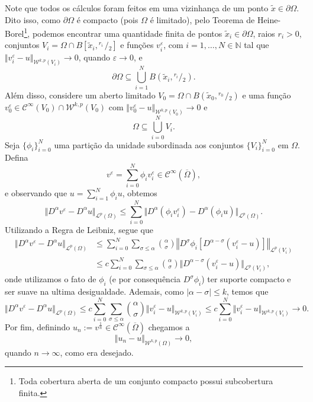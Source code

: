 \documentclass[a4paper, 11pt]{book}
\theoremstyle{definition}
\newcommand{\bN}{\mathbb{N}}
\newcommand{\cC}{\mathcal{C}}
\newcommand{\cL}{\mathcal{L}}
\newcommand{\cW}{\mathcal{W}}
\newcommand{\sfrac}[2]{{}^{#1}\!\!/\!_{#2}}
\begin{document}
\begin{prf}
    Note que todos os cálculos foram feitos em uma vizinhança de um ponto $\tilde x \in \partial\Omega$. Dito isso, como $\partial \Omega$ é compacto (pois $\Omega$ é limitado), pelo Teorema de Heine-Borel\footnote{Toda cobertura aberta de um conjunto compacto possui subcobertura finita.}, podemos encontrar uma quantidade finita de pontos $\tilde x_i \in \partial \Omega$, raios $r_i > 0$, conjuntos $V_i = \Omega \cap B[\tilde x_i,\sfrac{r_i\,}{2}]$ e funções $v_i^\varepsilon$, com $i = 1,\dots,N \in \bN$ tal que $\Vert v_i^\varepsilon - u \Vert_{\cW^{k,p}(V_i)} \to 0$, quando $\varepsilon \to 0$, e 
    \[
        \partial\Omega \subseteq \bigcup_{i=1}^N B(\tilde x_i, \sfrac{r_i}{2}).
    \]
    Além disso, considere um aberto limitado $V_0 = \Omega \cap B(\tilde x_0, \sfrac{r_0\,}{2})$ e uma função $v^\varepsilon_0 \in \cC^{\infty}(V_0) \cap \cW^{k,p}(V_0)$ com $\Vert v^\varepsilon_0 - u \Vert_{\cW^{k,p}(V_0)} \to 0$ e
    \[
        \Omega \subseteq \bigcup_{i=0}^N V_i.
    \]
    Seja $\{\phi_i\}_{i=0}^N$ uma partição da unidade subordinada aos conjuntos $\{V_i\}_{i=0}^N$ em $\Omega$.
    Defina
    \[
        v^\varepsilon = \sum_{i=0}^N \phi_i v_i^\varepsilon \in \cC^{\infty}(\overline\Omega),
    \]
    e observando que $u = \sum_{i=1}^N \phi_i u$, obtemos
    \[
        \Vert D^\alpha v^\varepsilon - D^\alpha u \Vert_{\cL^p(\Omega)} \leqslant \sum_{i=0}^N \Vert D^\alpha (\phi_i v_i^\varepsilon) - D^\alpha(\phi_i u) \Vert_{\cL^p(\Omega)}.
    \]
    Utilizando a Regra de Leibniz, segue que
    \[
        \begin{aligned}
            \Vert D^\alpha v^\varepsilon - D^\alpha u \Vert_{\cL^p(\Omega)} &\leqslant \sum_{i=0}^N\sum_{\sigma \leqslant \alpha} \binom{\alpha}{\sigma} \left\Vert  D^{\sigma} \phi_i \left[ D^{\alpha - \sigma} \left( v_i^\varepsilon - u \right) \right] \right\Vert _{\cL^p(V_i)}\\ 
            &\leqslant c\sum_{i=0}^N\sum_{\sigma \leqslant \alpha} \binom{\alpha}{\sigma} \Vert D^{\alpha-\sigma}(v^\varepsilon_i - u) \Vert_{\cL^p(V_i)},
        \end{aligned}
    \]
    onde utilizamos o fato de $\phi_i$ (e por consequência $D^\sigma \phi_i$) ter suporte compacto e ser suave na ultima desigualdade. 
    Ademais, como $|\alpha - \sigma| \leqslant k$, temos que
    \[
        \Vert D^\alpha v^\varepsilon - D^\alpha u \Vert_{\cL^p(\Omega)} \leqslant c \sum_{i=0}^N\sum_{\sigma \leqslant \alpha} \binom{\alpha}{\sigma} \Vert v_i^\varepsilon - u \Vert_{\cW^{k,p}(V_i)} \leqslant c\sum_{i=0}^N \Vert v_i^\varepsilon - u \Vert_{\cW^{k,p}(V_i)} \to 0 .
    \]
    Por fim, definindo $u_n := v^{\frac{1}{n}} \in \cC^{\infty}(\overline\Omega)$ chegamos a 
    \[
        \Vert u_n - u \Vert_{\cW^{k,p}(\Omega)} \to 0,
    \]
    quando $n \to \infty$, como era desejado.
\end{prf}
\end{document}
